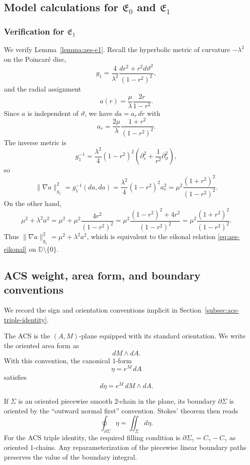 
\subsection{Model calculations for \texorpdfstring{$\mathfrak{E}_0$}{E0} and \texorpdfstring{$\mathfrak{E}_1$}{E1}}\label{subsec:appA-model}

\subsubsection*{Verification for \texorpdfstring{$\mathfrak{E}_1$}{E1}}
We verify Lemma~\ref{lemma:aes-e1}. Recall the hyperbolic metric of curvature $-\lambda^2$ on the Poincaré disc,
\[
g_1=\frac{4}{\lambda^2}\frac{dr^2+r^2 d\vartheta^2}{(1-r^2)^2},
\]
and the radial assignment
\[
a(r)=\frac{\mu}{\lambda}\frac{2r}{1-r^2}.
\]
Since $a$ is independent of $\vartheta$, we have $da=a_r\,dr$ with
\[
a_r=\frac{2\mu}{\lambda}\frac{1+r^2}{(1-r^2)^2}.
\]
The inverse metric is
\[
g_1^{-1}=\frac{\lambda^2}{4}(1-r^2)^2\left(\partial_r^2+\frac{1}{r^2}\partial_\vartheta^2\right),
\]
so
\[
\|\nabla a\|_{g_1}^2=g_1^{-1}(da,da)=\frac{\lambda^2}{4}(1-r^2)^2 a_r^2
=\mu^2\frac{(1+r^2)^2}{(1-r^2)^2}.
\]
On the other hand,
\[
\mu^2+\lambda^2 a^2
=\mu^2+\mu^2\frac{4r^2}{(1-r^2)^2}
=\mu^2\frac{(1-r^2)^2+4r^2}{(1-r^2)^2}
=\mu^2\frac{(1+r^2)^2}{(1-r^2)^2}.
\]
Thus $\|\nabla a\|_{g_1}^2=\mu^2+\lambda^2 a^2$, which is equivalent to the eikonal relation \eqref{eq:aes-eikonal} on $\mathbb{D}\setminus\{0\}$.

\subsection{ACS weight, area form, and boundary conventions}\label{subsec:appA-acs}

We record the sign and orientation conventions implicit in Section~\ref{subsec:acs-triple-identity}.

The ACS is the $(A,M)$-plane equipped with its standard orientation. We write the oriented area form as
\[
dM\wedge dA.
\]
With this convention, the canonical $1$-form
\[
\eta=e^M\,dA
\]
satisfies
\[
d\eta=e^M\,dM\wedge dA.
\]

If $\Sigma$ is an oriented piecewise smooth $2$-chain in the plane, its boundary $\partial\Sigma$ is oriented by the ``outward normal first'' convention. Stokes' theorem then reads
\[
\oint_{\partial\Sigma}\eta=\iint_{\Sigma} d\eta.
\]
For the ACS triple identity, the required filling condition is $\partial\Sigma_\gamma=C_{\bar\gamma}-C_\gamma$ as oriented $1$-chains. Any reparameterization of the piecewise linear boundary paths preserves the value of the boundary integral.
